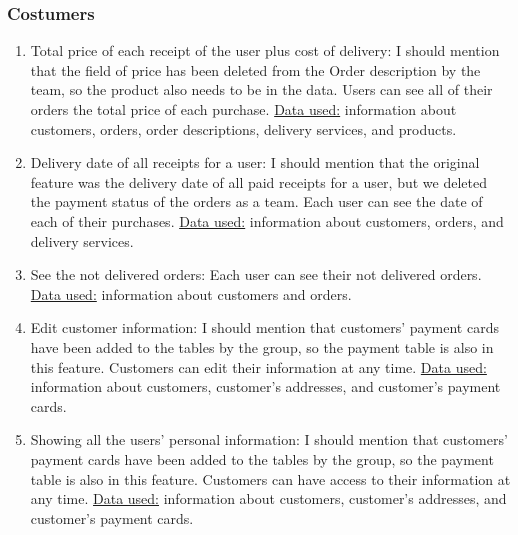 \documentclass{article}
\begin{document}
\subsubsection{Costumers}
\begin{enumerate}
  \item Total price of each receipt of the user plus cost of delivery: I should mention that the field of price has been deleted from the Order description by the team, so the product also needs to be in the data. Users can see all of their orders the total price of each purchase. \underline{Data used:} information about customers, orders, order descriptions, delivery services, and products.
  \item Delivery date of all receipts for a user: I should mention that the original feature was the delivery date of all paid receipts for a user, but we deleted the payment status of the orders as a team. Each user can see the date of each of their purchases. \underline{Data used:} information about customers, orders, and delivery services.
  \item See the not delivered orders: Each user can see their not delivered orders. \underline{Data used:} information about customers and orders.
  \item Edit customer information: I should mention that customers' payment cards have been added to the tables by the group, so the payment table is also in this feature. Customers can edit their information at any time. \underline{Data used:} information about customers, customer's addresses, and customer's payment cards.
  \item Showing all the users' personal information: I should mention that customers' payment cards have been added to the tables by the group, so the payment table is also in this feature. Customers can have access to their information at any time. \underline{Data used:} information about customers, customer's addresses, and customer's payment cards.
\end{enumerate}
\end{document}
